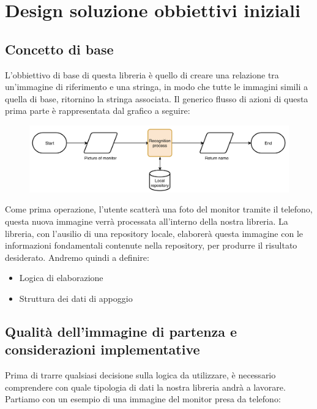 \documentclass[twoside]{supsistudent}
\newcommand{\Decaa}{\newline\vspace{0.5mm}\newline\noindent}
\begin{document}
\section{Design soluzione obbiettivi iniziali}
\subsection{Concetto di base}
L'obbiettivo di base di questa libreria è quello di creare una relazione tra un'immagine di riferimento e una stringa, in modo che tutte le immagini simili a quella di base, ritornino la stringa associata.
\Decaa
Il generico flusso di azioni di questa prima parte è rappresentata dal grafico a seguire:
\begin{figure}[h!]
  \centering
    \includegraphics[width=1\textwidth]{Pictures/base_idea_chart.png}
\end{figure}
\newline
Come prima operazione, l'utente scatterà una foto del monitor tramite il telefono, questa nuova immagine verrà processata all'interno della nostra libreria.
La libreria, con l'ausilio di una repository locale, elaborerà questa immagine con le informazioni fondamentali contenute nella repository, per produrre il risultato desiderato.
\Decaa
Andremo quindi a definire:
\begin{itemize}
\item Logica di elaborazione
\item Struttura dei dati di appoggio
\end{itemize}


\newpage
\subsection{Qualità dell'immagine di partenza e considerazioni implementative}
Prima di trarre qualsiasi decisione sulla logica da utilizzare, è necessario comprendere con quale tipologia di dati la nostra libreria andrà a lavorare. Partiamo con un esempio di una immagine del monitor presa da telefono:
\end{document}
